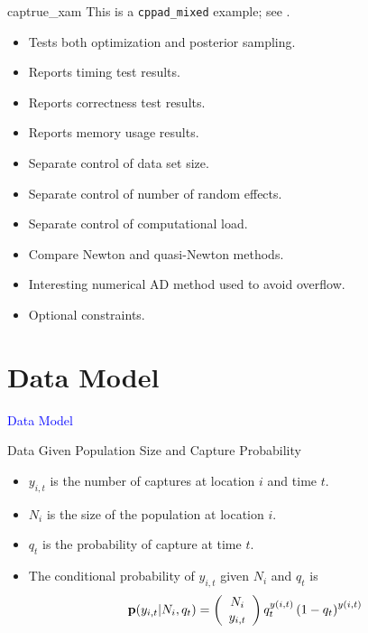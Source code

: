 \documentclass{beamer}
\newcommand{\Blue}[1]{\textcolor{blue}{#1}}
\newcommand{\B}[1]{{\bf #1}}
\newcommand{\Section}[1]{
	\section{#1}
	\begin{frame}
	\begin{center}
	\Blue{ \Large{#1} }
	\end{center}
	\end{frame}
}
\begin{document}
\begin{frame}{captrue\_xam}
This is a \texttt{cppad\_mixed} example; see  \cite{Royle2004}.

\begin{itemize}

\item
Tests both optimization and posterior sampling.
\pause

\item
Reports timing test results.
\pause

\item
Reports correctness test results.
\pause

\item
Reports memory usage results.
\pause

\item
Separate control of data set size.
\pause

\item
Separate control of number of random effects.
\pause

\item
Separate control of computational load.
\pause

\item
Compare Newton and quasi-Newton methods.
\pause

\item
Interesting numerical AD method used to avoid overflow.
\pause

\item
Optional constraints.

\end{itemize}
\end{frame}

\Section{Data Model}

\begin{frame}{Data Given Population Size and Capture Probability}
\begin{itemize}

\item
$y_{i,t}$ is the number of captures at location $i$ and time $t$.
\pause

\item
$N_i$ is the size of the population at location $i$.
\pause

\item
$q_t$ is the probability of capture at time $t$.
\pause

\item
The conditional probability of $y_{i,t}$ given $N_i$ and $q_t$ is
\[
\B{p} ( y_{i,t} | N_i , q_t )
=
\left( \begin{array}{c} N_i \\ y_{i,t} \end{array} \right)
q_t^{y(i,t)} \left( 1 - q_t\right)^{y(i,t)}
\]

\end{itemize}
\end{frame}
\end{document}
